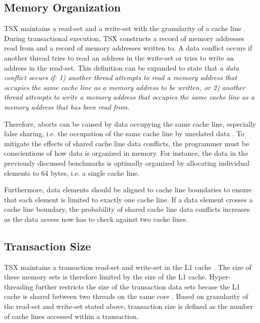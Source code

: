 \documentclass[a4paper]{article}
\begin{document}
\subsection{\textbf{Memory Organization}}

\indent 
TSX maintains a read-set and a write-set with the granularity of a cache line
\cite{intel_prog_man}.  During transactional execution, TSX constructs a
record of memory addresses read from and a record of memory addresses written
to.  A data conflict occurs if another thread tries to read an address in the
write-set or tries to write an address in the read-set.  This definition can be
expanded to state that \textit{a data conflict occurs if: 1) another thread attempts to
read a memory address that occupies the same cache line as a memory address to
be written, or 2) another thread attempts to write a memory address that
occupies the same cache line as a memory address that has been read from.}
\par

\indent 
Therefore, aborts can be caused by data occupying the same cache line,
especially false sharing, i.e. the occupation of the same cache line by
unrelated data \cite{intel_opt_man}.  To mitigate the effects of shared
cache line data conflicts, the programmer must be conscientious of how data is
organized in memory.  For instance, the data in the previously discussed
benchmarks is optimally organized by allocating individual elements to 64 bytes,
i.e. a single cache line.
\par

\indent 
Furthermore, data elements should be aligned to cache line boundaries
to ensure that each element is limited to exactly one cache line.  If a data
element crosses a cache line boundary, the probability of shared cache line data
conflicts increases as the data access now has to check against two cache lines.  
\par

\subsection{\textbf{Transaction Size}}

\indent
TSX maintains a transaction read-set and write-set in the L1 cache
\cite{intel_opt_man}.  The size of these memory sets is therefore limited by
the size of the L1 cache.  Hyper-threading further restricts the size of the
transaction data sets becase the L1 cache is shared between two threads on the
same core \cite{intel_opt_man}.  Based on granularity of the read-set and write-set stated
above, transaction size is defined as the number of cache lines accessed within
a transaction.  
\par 
\end{document}

